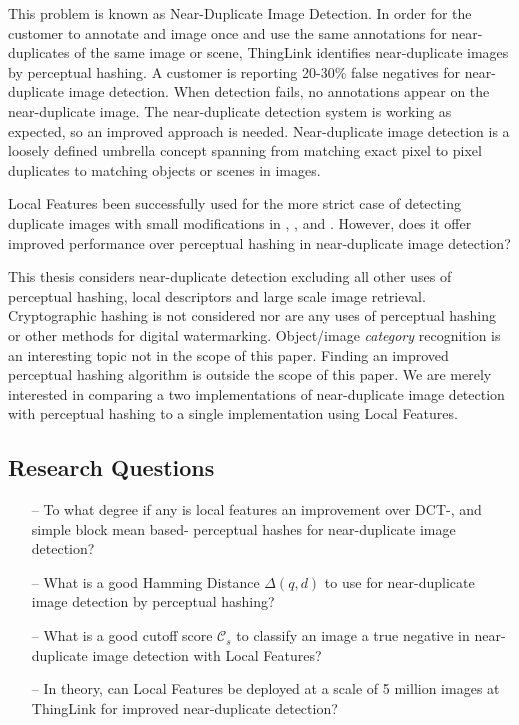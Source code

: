 \documentclass[english,12pt,a4paper,pdftex,elec,utf8, table]{aaltothesis}
\begin{document}
This problem is known as Near-Duplicate Image Detection. In order for the customer to annotate and image once and use the same annotations for near-duplicates of the same image or scene, ThingLink identifies near-duplicate images by perceptual hashing. A customer is reporting 20-30\% false negatives for near-duplicate image detection. When detection fails, no annotations appear on the near-duplicate image. The near-duplicate detection system is working as expected, so an improved approach is needed. Near-duplicate image detection is a loosely defined umbrella concept spanning from matching exact pixel to pixel duplicates to matching objects or scenes in images.

Local Features been successfully used for the more strict case of detecting duplicate images with small modifications in \cite{Chum2008}, \cite{Chum2010}, \cite{Lee2010} and \cite{dong2012high}. However, does it offer improved performance over perceptual hashing in near-duplicate image detection?

This thesis considers near-duplicate detection excluding all other uses of perceptual hashing, local descriptors and large scale image retrieval. Cryptographic hashing is not considered nor are any uses of perceptual hashing or other methods for digital watermarking. Object/image \emph{category} recognition is an interesting topic not in the scope of this paper. Finding an improved perceptual hashing algorithm is outside the scope of this paper. We are merely interested in comparing a two implementations of near-duplicate image detection with perceptual hashing to a single implementation using Local Features.

\subsection{Research Questions}
\begin{itemize}
\item[--] To what degree if any is local features an improvement over DCT-, and simple block mean based- perceptual hashes for near-duplicate image detection?
\item[--] What is a good Hamming Distance $\Delta(q,d)$ to use for near-duplicate image detection by perceptual hashing?
\item[--] What is a good cutoff score $\mathcal{C}_s$ to classify an image a true negative in near-duplicate image detection with Local Features?
\item[--] In theory, can Local Features be deployed at a scale of 5 million images at ThingLink for improved near-duplicate detection?
\end{itemize}
\end{document}
